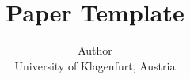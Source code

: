 \documentclass[a4paper]{article} %
\begin{document}
\title{Paper Template}

\author{%
  Author\\
  University of Klagenfurt, Austria
} %




\maketitle







\printbibliography{} %
\end{document}
